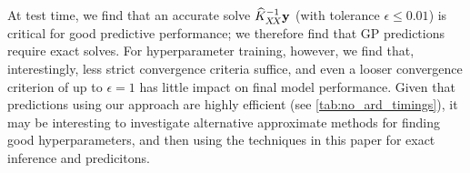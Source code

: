 At test time, we find that an accurate solve $\widehat {K}_{X \! X}^{-1} \mathbf{y}$ (with tolerance $\epsilon \leq 0.01$) is critical for good predictive performance; we therefore find that GP predictions require exact solves. For hyperparameter training, however, we find that, interestingly, less strict convergence criteria suffice, and even a looser convergence criterion of up to $\epsilon = 1$ has little impact on final model performance. Given that predictions using our approach are highly efficient (see \autoref{tab:no_ard_timings}), it may be interesting to investigate alternative approximate methods for finding good hyperparameters, and then using the techniques in this paper for exact inference and predicitons.
